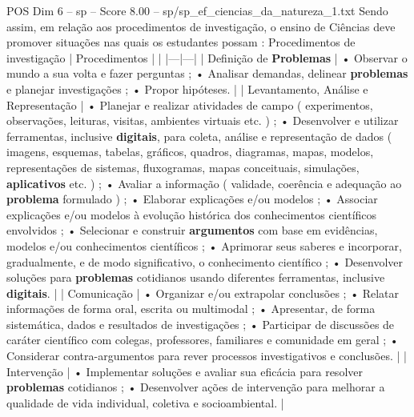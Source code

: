 \begin{textsample}{POS Dim 6 – sp – Score 8.00 – sp/sp\_ef\_ciencias\_da\_natureza\_1.txt}
Sendo assim, em relação aos procedimentos de investigação, o ensino de Ciências deve promover situações nas quais os estudantes possam : Procedimentos de investigação | Procedimentos | | |---|---| | Definição de \textbf{Problemas} | • Observar o mundo a sua volta e fazer perguntas ; • Analisar demandas, delinear \textbf{problemas} e planejar investigações ; • Propor hipóteses. | | Levantamento, Análise e Representação | • Planejar e realizar atividades de campo ( experimentos, observações, leituras, visitas, ambientes virtuais etc. ) ; • Desenvolver e utilizar ferramentas, inclusive \textbf{digitais}, para coleta, análise e representação de dados ( imagens, esquemas, tabelas, gráficos, quadros, diagramas, mapas, modelos, representações de sistemas, fluxogramas, mapas conceituais, simulações, \textbf{aplicativos} etc. ) ; • Avaliar a informação ( validade, coerência e adequação ao \textbf{problema} formulado ) ; • Elaborar explicações e/ou modelos ; • Associar explicações e/ou modelos à evolução histórica dos conhecimentos científicos envolvidos ; • Selecionar e construir \textbf{argumentos} com base em evidências, modelos e/ou conhecimentos científicos ; • Aprimorar seus saberes e incorporar, gradualmente, e de modo significativo, o conhecimento científico ; • Desenvolver soluções para \textbf{problemas} cotidianos usando diferentes ferramentas, inclusive \textbf{digitais}. | | Comunicação | • Organizar e/ou extrapolar conclusões ; • Relatar informações de forma oral, escrita ou multimodal ; • Apresentar, de forma sistemática, dados e resultados de investigações ; • Participar de discussões de caráter científico com colegas, professores, familiares e comunidade em geral ; • Considerar contra-argumentos para rever processos investigativos e conclusões. | | Intervenção | • Implementar soluções e avaliar sua eficácia para resolver \textbf{problemas} cotidianos ; • Desenvolver ações de intervenção para melhorar a qualidade de vida individual, coletiva e socioambiental. |

\end{textsample}
